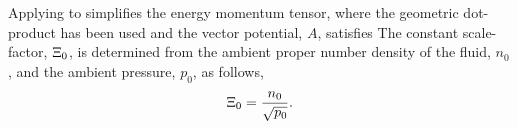 Applying  to  simplifies the energy momentum tensor,
where the geometric dot-product has been used and the vector potential, $A$,  satisfies
The constant scale-factor, $\Xi_0$, is determined from the ambient proper number density of the fluid, $n_0$, and the ambient pressure, $p_0$, as follows,
\begin{align}
\Xi_0 = \frac{n_0}{\sqrt{p_0}}. 
\label{eqn:scalefactor}
\end{align}

